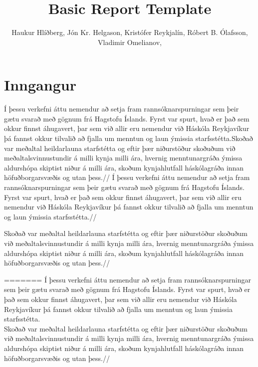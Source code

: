 \documentclass[12pt, svn, draft]{rureport}
\author{Haukur Hlíðberg, Jón Kr. Helgason, Kristófer Reykjalín, Róbert B. Ólafsson, Vladimir Omelianov,}  %
\title{Basic Report Template}  %
\begin{document}
\maketitle  %



\section{Inngangur} %

Í þessu verkefni áttu nemendur að setja fram rannsóknarspurningar sem þeir gætu svarað með gögnum frá Hagstofu Íslands. Fyrst var spurt, hvað er það sem okkur finnst áhugavert, þar sem við allir eru nemendur við Háskóla Reykjavíkur þá fannst okkur tilvalið að fjalla um  menntun og laun ýmissia starfsstétta.Skoðað var meðaltal heildarlauna starfstétta og eftir þær niðurstöður skoðuðum við meðaltalsvinnustundir á milli kynja milli ára,  hvernig menntunargráða ýmissa aldurshópa skiptist niður á milli ára, skoðum kynjahlutfall háskólagráða innan höfuðborgarsvæðis og utan þess.//
Í þessu verkefni áttu nemendur að setja fram rannsóknarspurningar sem þeir gætu svarað með gögnum frá Hagstofu Íslands. Fyrst var spurt, hvað er það sem okkur finnst áhugavert, þar sem við allir eru nemendur við Háskóla Reykjavíkur þá fannst okkur tilvalið að fjalla um  menntun og laun ýmissia starfsstétta.// 

Skoðað var meðaltal heildarlauna starfstétta og eftir þær niðurstöður skoðuðum við meðaltalsvinnustundir á milli kynja milli ára,  hvernig menntunargráða ýmissa aldurshópa skiptist niður á milli ára, skoðum kynjahlutfall háskólagráða innan höfuðborgarsvæðis og utan þess.// 

=======
Í þessu verkefni áttu nemendur að setja fram rannsóknarspurningar sem þeir gætu svarað með gögnum frá Hagstofu Íslands. Fyrst var spurt, hvað er það sem okkur finnst áhugavert, þar sem við allir eru nemendur við Háskóla Reykjavíkur þá fannst okkur tilvalið að fjalla um  menntun og laun ýmissia starfsstétta.\\ 

Skoðað var meðaltal heildarlauna starfstétta og eftir þær niðurstöður skoðuðum við meðaltalsvinnustundir á milli kynja milli ára,  hvernig menntunargráða ýmissa aldurshópa skiptist niður á milli ára, skoðum kynjahlutfall háskólagráða innan höfuðborgarsvæðis og utan þess.// 
\end{document}

